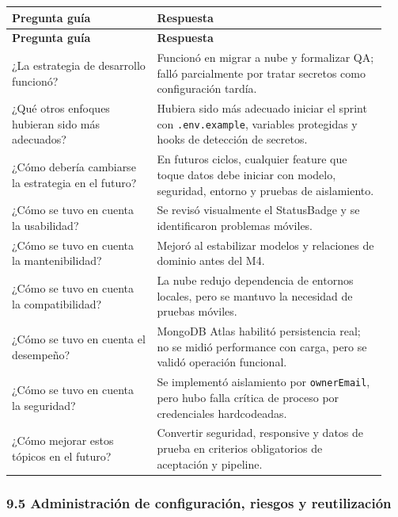 \documentclass[11pt,a4paper]{article}
\begin{document}
\begingroup
\small
\setlength{\tabcolsep}{3pt}
\begin{longtable}{P{0.36\linewidth}P{0.58\linewidth}}
\toprule
\textbf{Pregunta guía} & \textbf{Respuesta} \\
\midrule
\endfirsthead
\toprule
\textbf{Pregunta guía} & \textbf{Respuesta} \\
\midrule
\endhead
\bottomrule
\endlastfoot
¿La estrategia de desarrollo funcionó? & Funcionó en migrar a nube y formalizar QA; falló parcialmente por tratar secretos como configuración tardía. \\
¿Qué otros enfoques hubieran sido más adecuados? & Hubiera sido más adecuado iniciar el sprint con \texttt{.env.example}, variables protegidas y hooks de detección de secretos. \\
¿Cómo debería cambiarse la estrategia en el futuro? & En futuros ciclos, cualquier feature que toque datos debe iniciar con modelo, seguridad, entorno y pruebas de aislamiento. \\
¿Cómo se tuvo en cuenta la usabilidad? & Se revisó visualmente el StatusBadge y se identificaron problemas móviles. \\
¿Cómo se tuvo en cuenta la mantenibilidad? & Mejoró al estabilizar modelos y relaciones de dominio antes del M4. \\
¿Cómo se tuvo en cuenta la compatibilidad? & La nube redujo dependencia de entornos locales, pero se mantuvo la necesidad de pruebas móviles. \\
¿Cómo se tuvo en cuenta el desempeño? & MongoDB Atlas habilitó persistencia real; no se midió performance con carga, pero se validó operación funcional. \\
¿Cómo se tuvo en cuenta la seguridad? & Se implementó aislamiento por \texttt{ownerEmail}, pero hubo falla crítica de proceso por credenciales hardcodeadas. \\
¿Cómo mejorar estos tópicos en el futuro? & Convertir seguridad, responsive y datos de prueba en criterios obligatorios de aceptación y pipeline. \\
\end{longtable}
\endgroup

\subsubsection{9.5 Administración de configuración, riesgos y reutilización}
\end{document}
